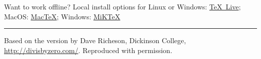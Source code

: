 \documentclass[10pt,landscape,letterpaper]{article}
\begin{document}
\begin{multicols}{3}
\vfill
Want to work offline? Local install options for Linux or Windows: \href{https://www.tug.org/texlive}{\TeX\ Live}; 
MacOS: \href{http://www.tug.org/mactex/}{Mac\TeX};
Windows: \href{http://miktex.org/}{MiK\TeX}
\vfill
\hrule
\vfill 
Based on the version by Dave Richeson, Dickinson College, \mbox{\url{http://divisbyzero.com/}}.
Reproduced with permission.
\end{multicols}

\end{document}
